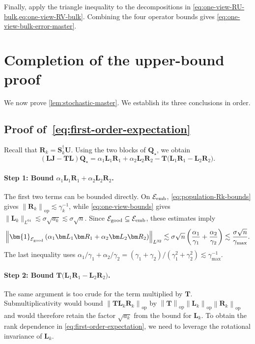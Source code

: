 \documentclass[11pt]{article}
\newcommand{\ind}{\bm{1}}
\newcommand{\opn}[1]{\left\lVert #1\right\rVert_{\mathrm{op}}}
\newcommand{\Lqn}[2]{\left\lVert #1\right\rVert_{L^{#2}}}
\newcommand{\cE}{\mathcal{E}}
\newcommand{\gmax}{\gamma_{\max}}
\begin{document}
Finally, apply the triangle inequality to the decompositions in
\cref{eq:one-view-RU-bulk,eq:one-view-RV-bulk}.  Combining the four
operator bounds gives \cref{eq:one-view-bulk-error-master}.


 


\section{Completion of the upper-bound proof}

We now prove \cref{lem:stochastic-master}. We establish its three conclusions
in order. 

\subsection{Proof of~\cref{eq:first-order-expectation}}
\label{app:first-order-error}

Recall that $\bm R_k=\bm S_k^\dagger\bm U$. Using the two blocks of
$\bm Q_\star$, we obtain
\begin{equation}
\label{eq:first-order-split}
  (\bm L\bm J-\bm T\bm L)\bm Q_\star
  =
  \alpha_1\bm L_1\bm R_1
  +
  \alpha_2\bm L_2\bm R_2
  -
  \bm T
  \bigl(
    \bm L_1\bm R_1-\bm L_2\bm R_2
  \bigr).
\end{equation}

\paragraph{Step 1: Bound $\alpha_1\bm L_1\bm R_1
  +
  \alpha_2\bm L_2\bm R_2$. }
The first two terms can be bounded directly. On $\cE_{\rm emb}$,
\cref{eq:population-Rk-bounds} gives
$\opn{\bm R_k}\lesssim\gamma_k^{-1}$, while
\cref{eq:one-view-bounds} gives
$\|\bm L_k\|_{L^{64}}\lesssim\sigma\sqrt{a_k}
\lesssim\sigma\sqrt n$. Since
$\cE_{\rm good}\subseteq\cE_{\rm emb}$, these estimates imply
\[
  \Lqn{
    \ind_{\cE_{\rm good}}
    \left(
      \alpha_1\bm L_1\bm R_1
      +
      \alpha_2\bm L_2\bm R_2
    \right)
  }{32}
  \lesssim
  \sigma\sqrt n
  \left(
    \frac{\alpha_1}{\gamma_1}
    +
    \frac{\alpha_2}{\gamma_2}
  \right)
  \lesssim
  \frac{\sigma\sqrt n}{\gmax}.
\]
The last inequality uses
$\alpha_1/\gamma_1+\alpha_2/\gamma_2
=(\gamma_1+\gamma_2)/(\gamma_1^2+\gamma_2^2)
\lesssim\gmax^{-1}$.

\paragraph{Step 2: Bound $\bm T
  \bigl(
    \bm L_1\bm R_1-\bm L_2\bm R_2
  \bigr)$. }
The same argument is too crude for the term multiplied by $\bm T$.
Submultiplicativity would bound
$\opn{\bm T\bm L_k\bm R_k}$ by
$\opn{\bm T}\opn{\bm L_k}\opn{\bm R_k}$ and would therefore retain
the factor $\sqrt{a_k}$ from the bound for $\bm L_k$. To obtain the rank
dependence in \cref{eq:first-order-expectation}, we need to leverage the rotational invariance of $\bm L_k$.
\end{document}
